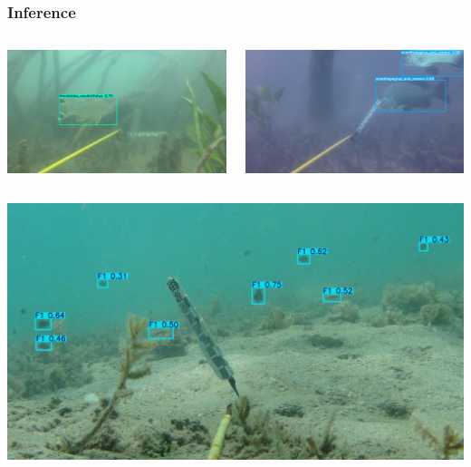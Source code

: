 \documentclass[serif]{beamer}  %
\begin{document}
\begin{frame}
\frametitle{Inference}
\centering
\begin{columns}
\begin{column}{0.5\textwidth}
	\centering
	\includegraphics[width=\textwidth]{images/9894_Amniataba_caudivittatus_f000002.jpg}
\end{column}

\begin{column}{0.5\textwidth}
	\centering
	\includegraphics[width=\textwidth]{images/9866_acanthopagrus_and_caranx_f000041.jpg}
\end{column}
\end{columns}

\begin{columns}
\begin{column}{0.5\textwidth}
	\centering
	\includegraphics[width=\textwidth]{images/7268_F1_f000242.jpg}	
\end{column}


\end{columns}
\end{frame}
\end{document}
